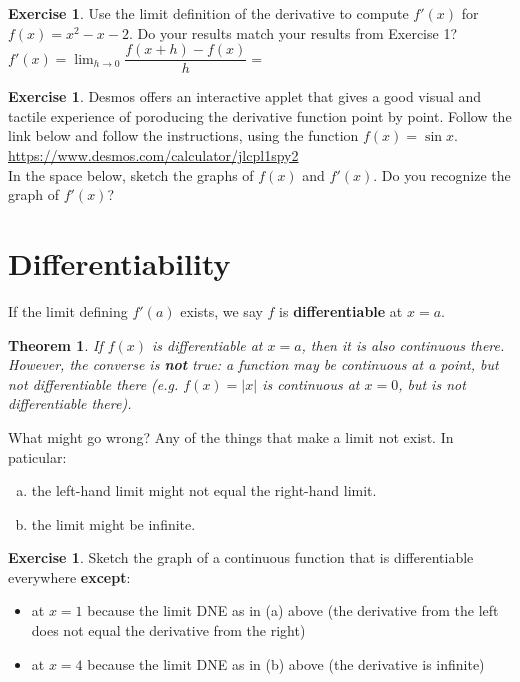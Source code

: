 \documentclass[11pt,reqno,final]{amsart}
\numberwithin{figure}{section}
\newtheorem{theorem}[equation]{Theorem}%
\theoremstyle{definition} %
\newtheorem{exercise}[question]{Exercise}
\newcommand{\dlim}{\displaystyle\lim}
\begin{document}
\newpage

\begin{exercise}
        Use the limit definition of the derivative to compute $f'(x)$ for $f(x) = x^2-x-2$.
        Do your results match your results from Exercise 1?\\
        $f'(x) = \dlim_{h \to 0}\dfrac{f(x+h) - f(x)}{h} = $
        \vfill
\end{exercise}

\begin{exercise}
        Desmos offers an interactive applet that gives a good visual and tactile experience of poroducing the derivative function point by point.
        Follow the link below and follow the instructions, using the function $f(x) = \sin x$.\\
        \url{https://www.desmos.com/calculator/jlcpl1spy2}\\
        In the space below, sketch the graphs of $f(x)$ and $f'(x)$. Do you recognize the graph of $f'(x)$?
        \vfill
\end{exercise}

\newpage

\section{Differentiability}

If the limit defining $f'(a)$ exists, we say $f$ is \textbf{differentiable} at $x=a$.

\begin{theorem}
        If $f(x)$ is differentiable at $x = a$, then it is also continuous there.
        However, the converse is \textbf{not} true: a function may be continuous at a point, but not differentiable there
        (e.g. $f(x) = |x|$ is continuous at $x = 0$, but is not differentiable there).
\end{theorem}

What might go wrong? Any of the things that make a limit not exist.
In paticular:
\begin{enumerate}[(a)]
\item the left-hand limit might not equal the right-hand limit.
\item the limit might be infinite.        
\end{enumerate}

\begin{exercise}
        Sketch the graph of a continuous function that is differentiable everywhere \textbf{except}:
        \begin{itemize}
        \item at $x = 1$ because the limit DNE as in (a) above (the derivative from the left does not equal the derivative from the right)
        \item at $x = 4$ because the limit DNE as in (b) above (the derivative is infinite)
        \end{itemize}
        \vfill
\end{exercise}
\end{document}
